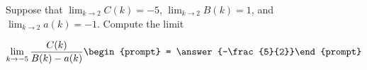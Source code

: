 \documentclass{ximera}
\author{Matthew Carr}
\begin{document}
\begin{exercise}
Suppose that $\lim_{k\to2}C(k)=-5$, $\lim_{k\to2}B(k)=1$, and $\lim_{k\to2}a(k)=-1$. Compute the limit

\[
\lim_{k\to -5 } \frac{C(k)}{B(k)-a(k)}\begin{prompt} = \answer{-\frac{5}{2}}\end{prompt}
\]
\end{exercise}
\end{document}
